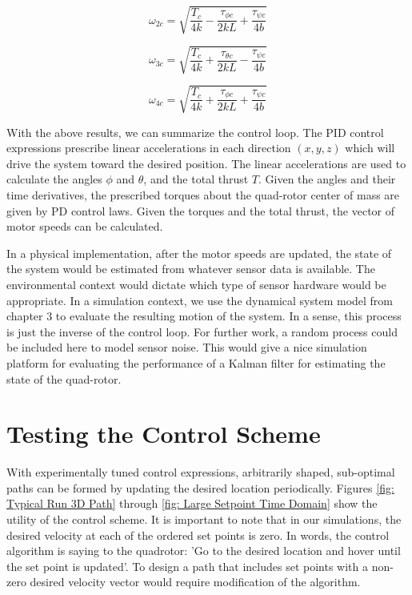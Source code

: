 \begin{equation}
    \omega_{2c} = \sqrt{ \frac{T_c}{4 k} - \frac{ \tau_{\phi c}}{2 k L}   + \frac{ \tau_{\psi c} }{4 b } }
\end{equation}

\begin{equation}
    \omega_{3c} = \sqrt{ \frac{T_c}{4 k} + \frac{ \tau_{\theta c}}{2 k L} - \frac{ \tau_{\psi c} }{4 b } }
\end{equation}

\begin{equation}
    \omega_{4c} = \sqrt{ \frac{T_c}{4 k} + \frac{ \tau_{\phi c}}{2 k L}   + \frac{ \tau_{\psi c} }{4 b } }
\end{equation}


With the above results, we can summarize the control loop. The PID control expressions prescribe linear accelerations in each direction $(x,y,z)$ which will drive the system toward the desired position. The linear accelerations are used to calculate the angles $\phi$ and $\theta$, and the total thrust $T$. Given the angles and their time derivatives, the prescribed torques about the quad-rotor center of mass are given by PD control laws. Given the torques and the total thrust, the vector of motor speeds can be calculated.

In a physical implementation, after the motor speeds are updated, the state of the system would be estimated from whatever sensor data is available. The environmental context would dictate which type of sensor hardware would be appropriate. In a simulation context, we use the dynamical system model from chapter 3 to evaluate the resulting motion of the system. In a sense, this process is just the inverse of the control loop. For further work, a random process could be included here to model sensor noise. This would give a nice simulation platform for evaluating the performance of a Kalman filter for estimating the state of the quad-rotor.

\section{Testing the Control Scheme}

With experimentally tuned control expressions, arbitrarily shaped, sub-optimal paths can be formed by updating the desired location periodically. Figures \ref{fig: Typical Run 3D Path} through \ref{fig: Large Setpoint Time Domain} show the utility of the control scheme. It is important to note that in our simulations, the desired velocity at each of the ordered set points is zero. In words, the control algorithm is saying to the quadrotor: 'Go to the desired location and hover until the set point is updated'. To design a path that includes set points with a non-zero desired velocity vector would require modification of the algorithm.

